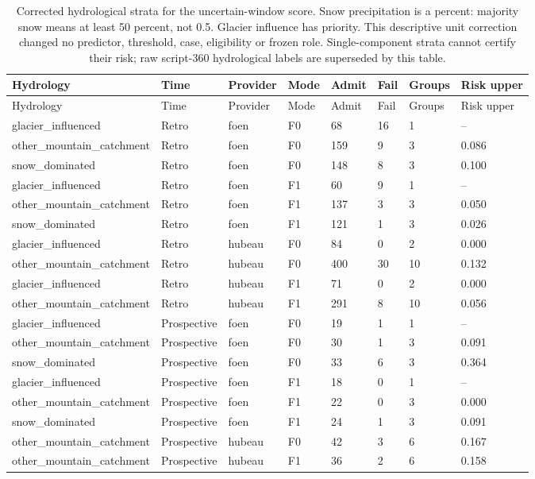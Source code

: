 {\tabletext
\setlength{\tabcolsep}{3pt}
\begin{longtable}{p{}p{}p{}p{}p{}p{}p{}p{}}
\caption{Corrected hydrological strata for the uncertain-window score. Snow precipitation is a percent: majority snow means at least 50 percent, not 0.5. Glacier influence has priority. This descriptive unit correction changed no predictor, threshold, case, eligibility or frozen role. Single-component strata cannot certify their risk; raw script-360 hydrological labels are superseded by this table.}\label{tab:r3si-hydrology}\\
\toprule
Hydrology & Time & Provider & Mode & Admit & Fail & Groups & Risk upper \\
\midrule
\endfirsthead
\toprule
Hydrology & Time & Provider & Mode & Admit & Fail & Groups & Risk upper \\
\midrule
\endhead
glacier\_\allowbreak influenced & Retro & foen & F0 & 68 & 16 & 1 & -- \\
other\_\allowbreak mountain\_\allowbreak catchment & Retro & foen & F0 & 159 & 9 & 3 & 0.086 \\
snow\_\allowbreak dominated & Retro & foen & F0 & 148 & 8 & 3 & 0.100 \\
glacier\_\allowbreak influenced & Retro & foen & F1 & 60 & 9 & 1 & -- \\
other\_\allowbreak mountain\_\allowbreak catchment & Retro & foen & F1 & 137 & 3 & 3 & 0.050 \\
snow\_\allowbreak dominated & Retro & foen & F1 & 121 & 1 & 3 & 0.026 \\
glacier\_\allowbreak influenced & Retro & hubeau & F0 & 84 & 0 & 2 & 0.000 \\
other\_\allowbreak mountain\_\allowbreak catchment & Retro & hubeau & F0 & 400 & 30 & 10 & 0.132 \\
glacier\_\allowbreak influenced & Retro & hubeau & F1 & 71 & 0 & 2 & 0.000 \\
other\_\allowbreak mountain\_\allowbreak catchment & Retro & hubeau & F1 & 291 & 8 & 10 & 0.056 \\
glacier\_\allowbreak influenced & Prospective & foen & F0 & 19 & 1 & 1 & -- \\
other\_\allowbreak mountain\_\allowbreak catchment & Prospective & foen & F0 & 30 & 1 & 3 & 0.091 \\
snow\_\allowbreak dominated & Prospective & foen & F0 & 33 & 6 & 3 & 0.364 \\
glacier\_\allowbreak influenced & Prospective & foen & F1 & 18 & 0 & 1 & -- \\
other\_\allowbreak mountain\_\allowbreak catchment & Prospective & foen & F1 & 22 & 0 & 3 & 0.000 \\
snow\_\allowbreak dominated & Prospective & foen & F1 & 24 & 1 & 3 & 0.091 \\
other\_\allowbreak mountain\_\allowbreak catchment & Prospective & hubeau & F0 & 42 & 3 & 6 & 0.167 \\
other\_\allowbreak mountain\_\allowbreak catchment & Prospective & hubeau & F1 & 36 & 2 & 6 & 0.158 \\
\bottomrule
\end{longtable}
}

